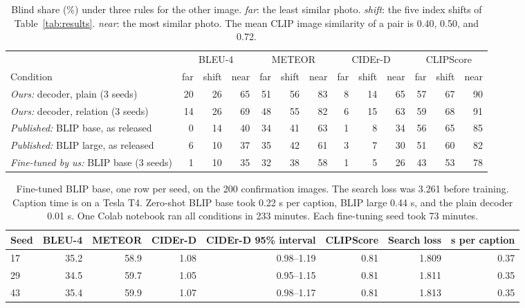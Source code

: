 \documentclass[11pt]{article}
\begin{document}
\begin{table}[h]
\centering\small
\setlength{\tabcolsep}{5pt}
\begin{tabular}{@{}l rrr rrr rrr rrr@{}}
\toprule
 & \multicolumn{3}{c}{BLEU-4} & \multicolumn{3}{c}{METEOR} & \multicolumn{3}{c}{CIDEr-D} & \multicolumn{3}{c}{CLIPScore} \\
\cmidrule(lr){2-4}\cmidrule(lr){5-7}\cmidrule(lr){8-10}\cmidrule(lr){11-13}
Condition & far & shift & near & far & shift & near & far & shift & near & far & shift & near \\
\midrule
\emph{Ours:} decoder, plain (3 seeds) & 20 & 26 & 65 & 51 & 56 & 83 & 8 & 14 & 65 & 57 & 67 & 90 \\
\emph{Ours:} decoder, relation (3 seeds) & 14 & 26 & 69 & 48 & 55 & 82 & 6 & 15 & 63 & 59 & 68 & 91 \\
\emph{Published:} BLIP base, as released & 0 & 14 & 40 & 34 & 41 & 63 & 1 & 8 & 34 & 56 & 65 & 85 \\
\emph{Published:} BLIP large, as released & 6 & 10 & 37 & 35 & 42 & 61 & 3 & 7 & 30 & 51 & 60 & 82 \\
\emph{Fine-tuned by us:} BLIP base (3 seeds) & 1 & 10 & 35 & 32 & 38 & 58 & 1 & 5 & 26 & 43 & 53 & 78 \\
\bottomrule
\end{tabular}
\caption{Blind share (\%) under three rules for the other image. \emph{far}: the
least similar photo. \emph{shift}: the five index shifts of
Table~\ref{tab:results}. \emph{near}: the most similar photo. The mean CLIP
image similarity of a pair is 0.40, 0.50, and 0.72.}
\label{tab:rules}
\end{table}

\begin{table}[h]
\centering\small
\begin{tabular}{@{}l rrrrr rr@{}}
\toprule
Seed & BLEU-4 & METEOR & CIDEr-D & CIDEr-D 95\% interval & CLIPScore & Search loss & s per caption \\
\midrule
17 & 35.2 & 58.9 & 1.08 & 0.98--1.19 & 0.81 & 1.809 & 0.37 \\
29 & 34.5 & 59.7 & 1.05 & 0.95--1.15 & 0.81 & 1.811 & 0.35 \\
43 & 35.4 & 59.9 & 1.07 & 0.98--1.17 & 0.81 & 1.813 & 0.35 \\
\bottomrule
\end{tabular}
\caption{Fine-tuned BLIP base, one row per seed, on the 200 confirmation
images. The search loss was 3.261 before training. Caption time is on a Tesla
T4. Zero-shot BLIP base took 0.22 s per caption, BLIP large 0.44 s, and the plain decoder 0.01 s.
One Colab notebook ran all conditions in 233 minutes. Each fine-tuning seed took 73 minutes.}
\label{tab:seeds}
\end{table}
\end{document}
